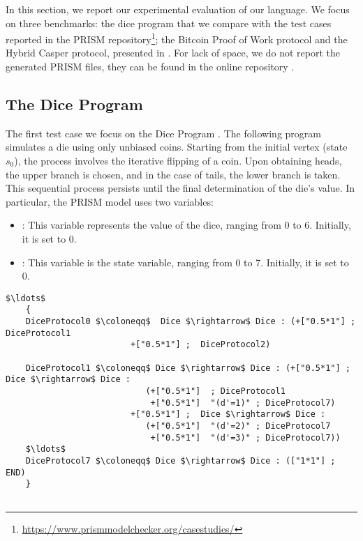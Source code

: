 In  this section, we report our experimental evaluation of our language. 
We focus on three benchmarks: the dice program that we compare with the  
test cases reported in the PRISM repository\footnote{\url{https://www.prismmodelchecker.org/casestudies/}}; 
the Bitcoin Proof of Work protocol and the Hybrid Casper protocol, 
presented in \cite{DBLP:journals/concurrency/BistarelliNGLMV23,DBLP:journals/distribledger/GallettaLMV23}.
For lack of space, we do not report the generated PRISM files, they can be found in the online repository \cite{repository}.
\subsection{The Dice Program}
 The first test case we focus on the Dice Program \cite{KY76}.
 The following program simulates a die using only unbiased coins. Starting from the initial vertex (state $s_0$), the process involves the iterative flipping of a coin. Upon obtaining heads, the upper branch is chosen, and in the case of tails, the lower branch is taken. This sequential process persists until the final determination of the die's value.
 In particular, the PRISM model uses two variables: 
 \begin{itemize}
	\item {}: This variable represents the value of the dice, ranging from 0 to 6. Initially, it is set to 0.
	\item {}: This variable is the state variable, ranging from 0 to 7. Initially, it is set to 0.
 \end{itemize}
 
 \vspace{-0.25cm}
 \begin{lstlisting}[style=chor-color,caption={Choreographic language for the Dice Program},captionpos=b,label={ex1-code}]
	$\ldots$
	{
	DiceProtocol0 $\coloneqq$  Dice $\rightarrow$ Dice : (+["0.5*1"] ; DiceProtocol1
						 +["0.5*1"] ;  DiceProtocol2)
	
	DiceProtocol1 $\coloneqq$ Dice $\rightarrow$ Dice : (+["0.5*1"] ; Dice $\rightarrow$ Dice : 
							(+["0.5*1"]  ; DiceProtocol1
							 +["0.5*1"]  "(d'=1)" ; DiceProtocol7)
					     +["0.5*1"] ;  Dice $\rightarrow$ Dice : 
							(+["0.5*1"]  "(d'=2)" ; DiceProtocol7
							 +["0.5*1"]  "(d'=3)" ; DiceProtocol7))
	$\ldots$
	DiceProtocol7 $\coloneqq$ Dice $\rightarrow$ Dice : (["1*1"] ; END)
	}
		
	\end{lstlisting}

